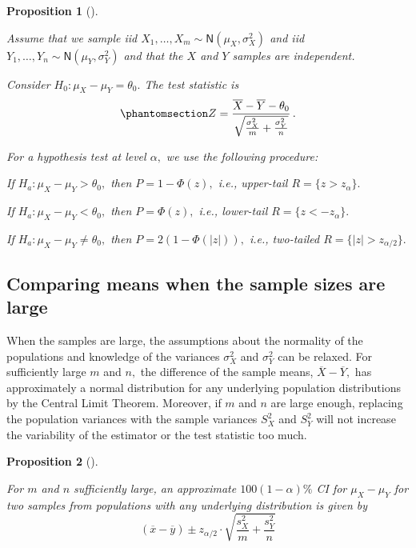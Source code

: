 \documentclass[
  a4paper,
  DIV=11,
  numbers=noendperiod,
  oneside]{scrreprt}
\theoremstyle{definition}
\theoremstyle{definition}
\theoremstyle{plain}
\newtheorem{proposition}{Proposition}[chapter]
\theoremstyle{plain}
\theoremstyle{definition}
\theoremstyle{remark}
\begin{document}
\begin{proposition}[]\protect\hypertarget{prp-htest-compare-means-normpops-vars-known}{}\label{prp-htest-compare-means-normpops-vars-known}

Assume that we sample iid
\(X_1, \dots, X_m \sim \mathsf{N}(\mu_X, \sigma_X^2)\) and iid
\(Y_1, \dots, Y_n \sim \mathsf{N}(\mu_Y, \sigma_Y^2)\) and that the
\(X\) and \(Y\) samples are independent.

Consider \(H_0 : \mu_X - \mu_Y = \theta_0.\) The test statistic is
\begin{equation}\phantomsection\label{eq-htest-compare-means-normpops-vars-known-statistic}{
 Z = \frac{\overline{X} - \overline{Y} - \theta_0}{\sqrt{\frac{\sigma_{X}^2}{m} + \frac{\sigma_{Y}^2}{n}}}\,.
}\end{equation}

For a hypothesis test at level \(\alpha,\) we use the following
procedure:

If \(H_a : \mu_X - \mu_Y > \theta_0,\) then \(P = 1 - \Phi(z),\) i.e.,
upper-tail \(R = \{z > z_{\alpha}\}.\)

If \(H_a : \mu_X - \mu_Y < \theta_0,\) then \(P = \Phi(z),\) i.e.,
lower-tail \(R = \{z < - z_{\alpha}\}.\)

If \(H_a : \mu_X - \mu_Y \neq \theta_0,\) then \(P = 2(1-\Phi(|z|)),\)
i.e., two-tailed \(R = \{|z| > z_{\alpha/2}\}.\)

\end{proposition}

\subsection{Comparing means when the sample sizes are
large}\label{sec-compare-means-large-samples}

When the samples are large, the assumptions about the normality of the
populations and knowledge of the variances \(\sigma_X^2\) and
\(\sigma_Y^2\) can be relaxed. For sufficiently large \(m\) and \(n,\)
the difference of the sample means, \(\overline{X} - \overline{Y},\) has
approximately a normal distribution for any underlying population
distributions by the Central Limit Theorem. Moreover, if \(m\) and \(n\)
are large enough, replacing the population variances with the sample
variances \(S_X^2\) and \(S_Y^2\) will not increase the variability of
the estimator or the test statistic too much.

\begin{proposition}[]\protect\hypertarget{prp-ci-compare-means-large-samples}{}\label{prp-ci-compare-means-large-samples}

For \(m\) and \(n\) sufficiently large, an approximate
\(100(1-\alpha)\%\) CI for \(\mu_X - \mu_Y\) for two samples from
populations with any underlying distribution is given by \[
 (\overline{x} - \overline{y}) \pm z_{\alpha/2} 
 \cdot \sqrt{\frac{s_{X}^2}{m} + \frac{s_{Y}^2}{n}}
\]

\end{proposition}
\end{document}
